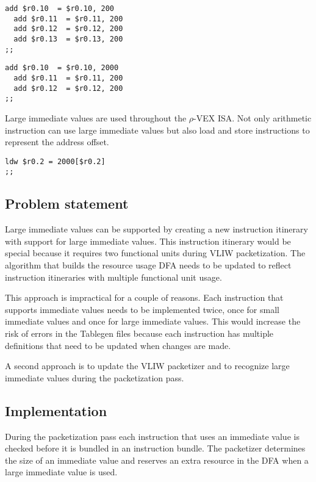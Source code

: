 \begin{lstlisting}[language=rvex]
  add $r0.10  = $r0.10, 200
  add $r0.11  = $r0.11, 200
  add $r0.12  = $r0.12, 200
  add $r0.13  = $r0.13, 200
;;
\end{lstlisting}

\begin{lstlisting}[language=rvex]
  add $r0.10  = $r0.10, 2000
  add $r0.11  = $r0.11, 200
  add $r0.12  = $r0.12, 200
;;
\end{lstlisting}

Large immediate values are used throughout the $\rho$-VEX ISA. Not only arithmetic instruction can use large immediate values but also load and store instructions to represent the address offset.

\begin{lstlisting}[language=rvex]
  ldw $r0.2 = 2000[$r0.2]
;;
\end{lstlisting}

\subsection{Problem statement} %
\label{sub:problem_statement}
Large immediate values can be supported by creating a new instruction itinerary with support for large immediate values. This instruction itinerary would be special because it requires two functional units during VLIW packetization. The algorithm that builds the resource usage DFA needs to be updated to reflect instruction itineraries with multiple functional unit usage.

This approach is impractical for a couple of reasons. Each instruction that supports immediate values needs to be implemented twice, once for small immediate values and once for large immediate values. This would increase the risk of errors in the Tablegen files because each instruction has multiple definitions that need to be updated when changes are made.

A second approach is to update the VLIW packetizer and to recognize large immediate values during the packetization pass.


\subsection{Implementation} %
\label{sub:implementation}
During the packetization pass each instruction that uses an immediate value is checked before it is bundled in an instruction bundle. The packetizer determines the size of an immediate value and reserves an extra resource in the DFA when a large immediate value is used.

